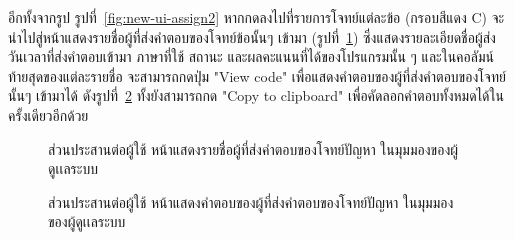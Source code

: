 \documentclass[12pt,one side,openright,a4paper]{cpe-thesis-th}
\newcommand{\thaijustify}[1]{%
  \par\hspace{30pt}\justifying
  #1
}
\begin{document}
\thaijustify{
  อีกทั้งจากรูป รูปที่~\ref{fig:new-ui-assign2} หากกดลงไปที่รายการโจทย์แต่ละข้อ (กรอบสีแดง C) จะนำไปสู่หน้าแสดงรายชื่อผู้ที่ส่งคำตอบของโจทย์ข้อนั้นๆ เข้ามา (รูปที่~\ref{fig:new-ui-assign3}) ซึ่งแสดงรายละเอียดชื่อผู้ส่ง วันเวลาที่ส่งคำตอบเข้ามา ภาษาที่ใช้ สถานะ และผลคะแนนที่ได้ของโปรแกรมนั้น ๆ และในคอลัมน์ท้ายสุดของแต่ละรายชื่อ จะสามารถกดปุ่ม "View code" เพื่อแสดงคำตอบของผู้ที่ส่งคำตอบของโจทย์นั้นๆ เข้ามาได้ ดังรูปที่~\ref{fig:new-ui-assign4} ทั้งยังสามารถกด "Copy to clipboard" เพื่อคัดลอกคำตอบทั้งหมดได้ในครั้งเดียวอีกด้วย
}
\begin{figure}[H]
  \centering
  \caption[ส่วนประสานต่อผู้ใช้ หน้าแสดงรายชื่อผู้ที่ส่งคำตอบของโจทย์ปัญหา]{ส่วนประสานต่อผู้ใช้ หน้าแสดงรายชื่อผู้ที่ส่งคำตอบของโจทย์ปัญหา ในมุมมองของผู้ดูเเลระบบ}
  \label{fig:new-ui-assign3}
\end{figure}
\begin{figure}[H]
  \centering
  \caption[ส่วนประสานต่อผู้ใช้ หน้าแสดงคำตอบของผู้ที่ส่งคำตอบของโจทย์ปัญหา]{ส่วนประสานต่อผู้ใช้ หน้าแสดงคำตอบของผู้ที่ส่งคำตอบของโจทย์ปัญหา ในมุมมองของผู้ดูเเลระบบ}
  \label{fig:new-ui-assign4}
\end{figure}
\pagebreak
\end{document}
